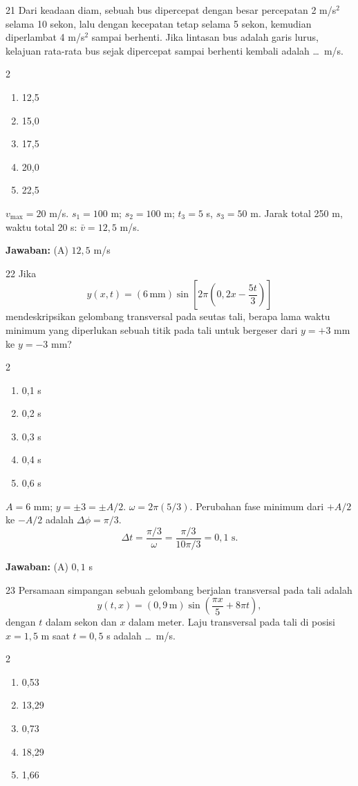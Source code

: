 \documentclass[11pt]{article}
\newenvironment{pilB}{%
  \par\smallskip\begin{multicols}{2}
  \begin{enumerate}[label=(\Alph*),leftmargin=*,itemsep=1pt,topsep=3pt]}%
  {\end{enumerate}\end{multicols}}
\newcommand{\jawaban}[1]{%
  \noindent\colorbox{gold!30}{\parbox{\dimexpr\linewidth-2\fboxsep\relax}{%
    \textbf{Jawaban:} #1}}\par\smallskip}
\begin{document}
\begin{soal}{21}
Dari keadaan diam, sebuah bus dipercepat dengan besar percepatan
2 m/s$^2$ selama 10 sekon, lalu dengan kecepatan tetap selama 5 sekon,
kemudian diperlambat 4 m/s$^2$ sampai berhenti. Jika lintasan bus
adalah garis lurus, kelajuan rata-rata bus sejak dipercepat sampai
berhenti kembali adalah \ldots\ m/s.
\begin{pilB}
  \item 12,5 \item 15,0 \item 17,5 \item 20,0 \item 22,5
\end{pilB}
\end{soal}

\begin{pembox}
$v_{\max}=20$ m/s. $s_1=100$ m; $s_2=100$ m; $t_3=5$ s, $s_3=50$ m. Jarak total 250 m, waktu total 20 s: $\bar v=12{,}5$ m/s.
\jawaban{(A) $12{,}5$ m/s}
\end{pembox}

\begin{soal}{22}
Jika
\[
  y(x,t) = (6\,\text{mm})\sin\!\left[2\pi\!\left(0{,}2x-\frac{5t}{3}\right)\right]
\]
mendeskripsikan gelombang transversal pada seutas tali, berapa lama
waktu minimum yang diperlukan sebuah titik pada tali untuk bergeser dari
$y=+3$ mm ke $y=-3$ mm?
\begin{pilB}
  \item 0,1 s \item 0,2 s \item 0,3 s \item 0,4 s \item 0,6 s
\end{pilB}
\end{soal}

\begin{pembox}
$A=6$ mm; $y=\pm3=\pm A/2$. $\omega=2\pi(5/3)$. Perubahan fase minimum dari $+A/2$ ke $-A/2$ adalah $\Delta\phi=\pi/3$.
\[\Delta t=\frac{\pi/3}{\omega}=\frac{\pi/3}{10\pi/3}=0{,}1\text{ s.}\]
\jawaban{(A) $0{,}1$ s}
\end{pembox}

\begin{soal}{23}
Persamaan simpangan sebuah gelombang berjalan transversal pada tali adalah
\[
  y(t,x)=(0{,}9\,\text{m})\sin\!\left(\frac{\pi x}{5}+8\pi t\right),
\]
dengan $t$ dalam sekon dan $x$ dalam meter. Laju transversal pada tali
di posisi $x=1{,}5$ m saat $t=0{,}5$ s adalah \ldots\ m/s.
\begin{pilB}
  \item 0,53 \item 13,29 \item 0,73 \item 18,29 \item 1,66
\end{pilB}
\end{soal}
\end{document}
